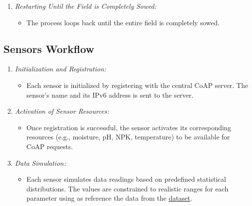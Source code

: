 \begin{enumerate}
    \item \textit{Restarting Until the Field is Completely Sowed:}
          \begin{itemize}
              \item The process loops back until the entire field is completely sowed.
          \end{itemize}

\end{enumerate}

\newpage




\subsection{Sensors Workflow}

\begin{enumerate}
    \item \textit{Initialization and Registration:}
          \begin{itemize}
              \item Each sensor is initialized by registering with the central CoAP server. The sensor's name and its IPv6 address is sent to the server.
          \end{itemize}

    \item \textit{Activation of Sensor Resources:}
          \begin{itemize}
              \item Once registration is successful, the sensor activates its corresponding resources (e.g., moisture, pH, NPK, temperature) to be available for CoAP requests.
          \end{itemize}

    \item \textit{Data Simulation:}
          \begin{itemize}
              \item Each sensor simulates data readings based on predefined statistical distributions. The values are constrained to realistic ranges for each parameter using as reference the data from the \href{https://www.kaggle.com/code/mdshariaremonshaikat/optimizing-agricultural-production-with-7-ml-model/input}{dataset}.
          \end{itemize}


\end{enumerate}
